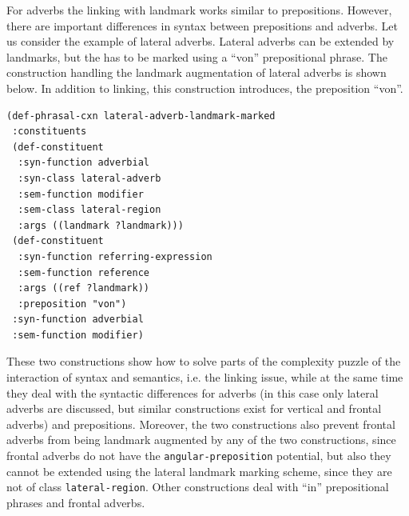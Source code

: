 For adverbs the linking with landmark works similar to prepositions. 
However, there are important differences in syntax between prepositions
and adverbs. Let us consider the example of lateral adverbs.
Lateral adverbs can be extended by landmarks, but the has to 
be marked using a ``von'' prepositional phrase. 
The construction handling the landmark augmentation of lateral adverbs 
is shown below. In addition to linking, this construction introduces, 
the preposition ``von''. 


\begin{example}
\begin{footnotesize}
\begin{verbatim}
(def-phrasal-cxn lateral-adverb-landmark-marked
 :constituents
 (def-constituent
  :syn-function adverbial
  :syn-class lateral-adverb 
  :sem-function modifier
  :sem-class lateral-region
  :args ((landmark ?landmark)))
 (def-constituent
  :syn-function referring-expression
  :sem-function reference
  :args ((ref ?landmark))
  :preposition "von")
 :syn-function adverbial
 :sem-function modifier)
\end{verbatim}
\end{footnotesize}
\label{e:lateral-adverb-landmark-marked}
\end{example}


These two constructions show how to solve parts of the  
complexity puzzle of the interaction of syntax and semantics, 
i.e. the linking issue, while at the same time they deal with the syntactic 
differences for adverbs (in this case only lateral adverbs are discussed, 
but similar constructions exist for vertical and frontal adverbs) and 
prepositions. Moreover, the two constructions also 
prevent frontal adverbs from being 
landmark augmented by any of the two constructions, 
since frontal adverbs do not have
the {\footnotesize\tt angular-preposition} potential, but also they 
cannot be extended using the lateral 
landmark marking scheme, since they are not of class 
{\footnotesize\tt lateral-region}. Other constructions deal with 
``in'' prepositional phrases and frontal adverbs.




